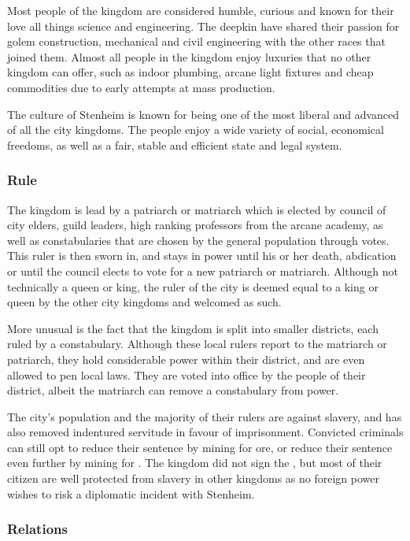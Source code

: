 Most people of the kingdom are considered humble, curious and known for their
love all things science and engineering. The deepkin have shared their passion
for golem construction, mechanical and civil engineering with the other races
that joined them. Almost all people in the kingdom enjoy luxuries that no
other kingdom can offer, such as indoor plumbing, arcane light fixtures and
cheap commodities due to early attempts at mass production.

The culture of Stenheim is known for being one of the most liberal and
advanced of all the city kingdoms. The people enjoy a wide variety of social,
economical freedoms, as well as a fair, stable and efficient state and legal
system.

\subsubsection{Rule}

The kingdom is lead by a patriarch or matriarch which is elected by council of
city elders, guild leaders, high ranking professors from the arcane academy,
as well as constabularies that are chosen by the general population through
votes. This ruler is then sworn in, and stays in power until his or her death,
abdication or until the council elects to vote for a new patriarch or
matriarch. Although not technically a queen or king, the ruler of the city is
deemed equal to a king or queen by the other city kingdoms and welcomed as
such.

More unusual is the fact that the kingdom is split into smaller districts,
each ruled by a constabulary. Although these local rulers report to the
matriarch or patriarch, they hold considerable power within their district,
and are even allowed to pen local laws. They are voted into office by the
people of their district, albeit the matriarch can remove a constabulary from
power.

The city's population and the majority of their rulers are against slavery,
and has also removed indentured servitude in favour of imprisonment. Convicted
criminals can still opt to reduce their sentence by mining for ore, or reduce
their sentence even further by mining for . The kingdom
did not sign the , but most of their citizen are
well protected from slavery in other kingdoms as no foreign power wishes to
risk a diplomatic incident with Stenheim.

\subsubsection{Relations}

